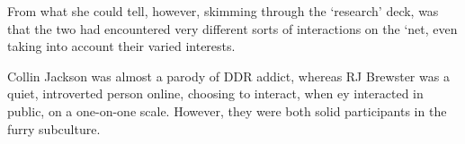 From what she could tell, however, skimming through the `research' deck, was that the two had encountered very different sorts of interactions on the `net, even taking into account their varied interests.

Collin Jackson was almost a parody of DDR addict, whereas RJ Brewster was a quiet, introverted person online, choosing to interact, when ey interacted in public, on a one-on-one scale.  However, they were both solid participants in the furry subculture.

